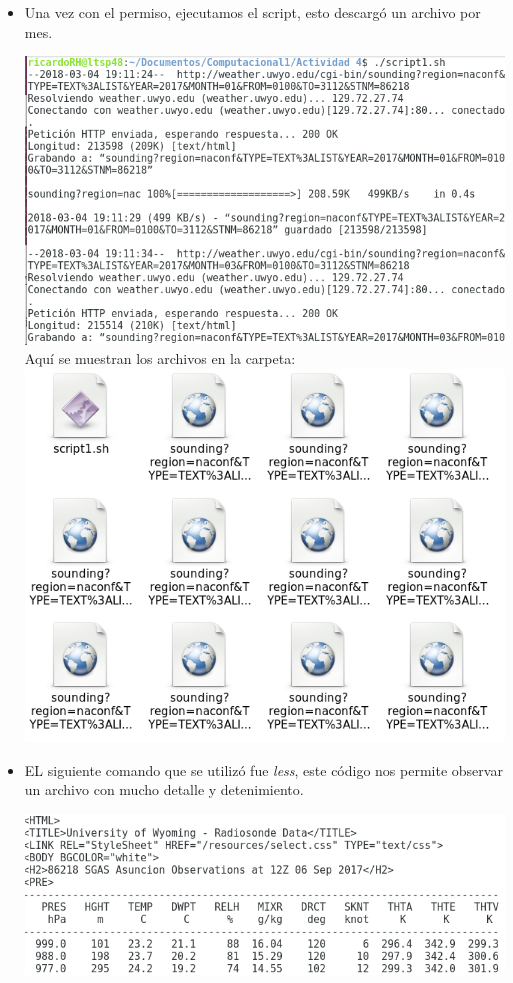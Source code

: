 \documentclass{article}
\begin{document}
\begin{doublespace}
\begin{itemize}
\item Una vez con el permiso, ejecutamos el script, esto descargó un archivo por mes.
\\
\begin{center}
\includegraphics[scale=0.4]{act43.png}
\\
Aquí se muestran los archivos en la carpeta:
\\
\includegraphics[scale=0.4]{act44.png}
\end{center}

\item EL siguiente comando que se utilizó fue \textit{less}, este código nos permite observar un archivo con mucho detalle y detenimiento.
\\
\begin{center}
\includegraphics[scale=0.5]{act45.png}
\end{center}


\end{itemize}
\end{doublespace}
\end{document}
